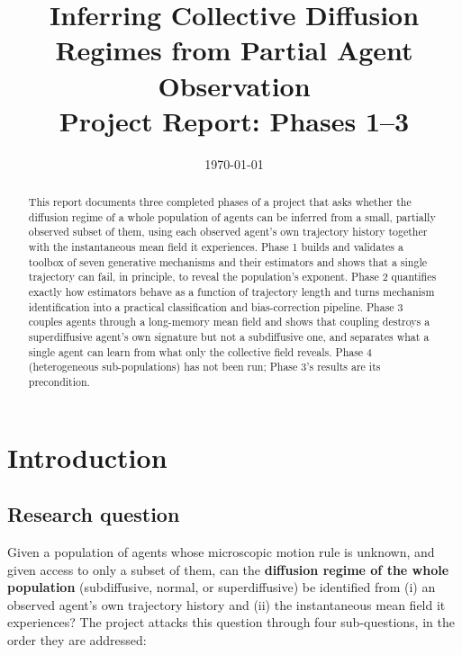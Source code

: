 \documentclass[11pt]{article}
\title{Inferring Collective Diffusion Regimes from Partial Agent Observation\\[4pt]
\large Project Report: Phases 1--3}
\author{}
\date{\today}
\begin{document}
\maketitle

\begin{abstract}
\noindent
This report documents three completed phases of a project that asks whether the
diffusion regime of a whole population of agents can be inferred from a small,
partially observed subset of them, using each observed agent's own trajectory
history together with the instantaneous mean field it experiences. Phase 1
builds and validates a toolbox of seven generative mechanisms and their
estimators and shows that a single trajectory can fail, in principle, to reveal
the population's exponent. Phase 2 quantifies exactly how estimators behave as a
function of trajectory length and turns mechanism identification into a
practical classification and bias-correction pipeline. Phase 3 couples agents
through a long-memory mean field and shows that coupling destroys a
superdiffusive agent's own signature but not a subdiffusive one, and separates
what a single agent can learn from what only the collective field reveals.
Phase 4 (heterogeneous sub-populations) has not been run; Phase 3's results are
its precondition.
\end{abstract}

\tableofcontents

\section{Introduction}
\label{sec:intro}

\subsection{Research question}

Given a population of agents whose microscopic motion rule is unknown, and
given access to only a subset of them, can the \textbf{diffusion regime of the
whole population} (subdiffusive, normal, or superdiffusive) be identified from
(i) an observed agent's own trajectory history and (ii) the instantaneous mean
field it experiences? The project attacks this question through four
sub-questions, in the order they are addressed:
\end{document}
